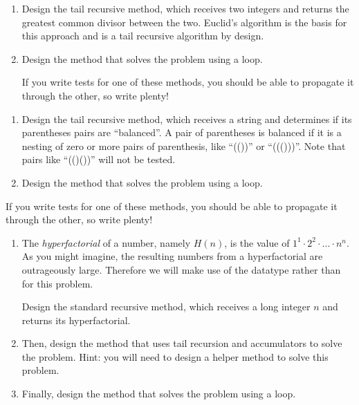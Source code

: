 \begin{enumerate}[label=(\alph*)]
    \item Design the  tail recursive method, which receives two integers and returns the greatest common divisor between the two. Euclid's algorithm is the basis for this approach and is a tail recursive algorithm by design.
    \item Design the  method that solves the problem using a loop.

    If you write tests for one of these methods, you should be able to propagate it through the other, so write plenty!
\end{enumerate}

\begin{enumerate}[label=(\alph*)]
    \item Design the  tail recursive method, which receives a string and determines if its parentheses pairs are ``balanced''. A pair of parentheses is balanced if it is a nesting of zero or more pairs of parenthesis, like ``(())'' or ``((()))''. Note that pairs like ``(()())'' will not be tested.

    \item Design the  method that solves the problem using a loop.
\end{enumerate}

If you write tests for one of these methods, you should be able to propagate it through the other, so write plenty!


\begin{enumerate}[label=(\alph*)]
    \item The \textit{hyperfactorial} of a number, namely $H(n)$, is the value of $1^1 \cdot 2^2 \cdot ... \cdot n^n$. As you might imagine, the resulting numbers from a hyperfactorial are outrageously large. Therefore we will make use of the  datatype rather than  for this problem. 
    
    Design the standard recursive  method, which receives a long integer $n$ and returns its hyperfactorial.
    \item Then, design the  method that uses tail recursion and accumulators to solve the problem. Hint: you will need to design a  helper method to solve this problem.

    \item Finally, design the  method that solves the problem using a loop.
\end{enumerate}

